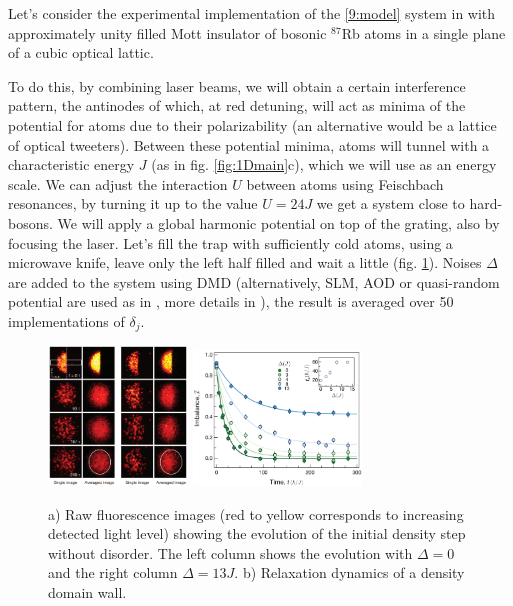 Let's consider the experimental implementation of the \eqref{9:model} system in \cite{Choi_2016} with approximately unity filled Mott insulator of bosonic ${}^{87}$Rb atoms in a single plane of a cubic optical lattic. 


To do this, by combining laser beams, we will obtain a certain interference pattern, the antinodes of which, at red detuning, will act as minima of the potential for atoms due to their polarizability (an alternative would be a lattice of optical tweeters). Between these potential minima, atoms will tunnel with a characteristic energy $J$ (as in fig. \ref{fig:1Dmain}c), which we will use as an energy scale. We can adjust the interaction $U$ between atoms using Feischbach resonances, by turning it up to the value $U=24J$ we get a system close to hard-bosons. We will apply a global harmonic potential on top of the grating, also by focusing the laser. Let's fill the trap with sufficiently cold atoms, using a microwave knife, leave only the left half filled and wait a little (fig. \ref{fig:loc2D1}). Noises $\Delta$ are added to the system using DMD (alternatively, SLM, AOD or quasi-random potential are used as in \cite{schreiber_observation_2015}, more details in \cite{abanin_many-body_2019}), the result is averaged over 50 implementations of $\delta_j$.

\begin{figure}[h]
    \centering
    \includegraphics[align=c, width=0.33\textwidth]{imgs/MBL_2D_exp_1.png}
    \hspace{10 mm} 
    \includegraphics[align=c, width=0.4\textwidth]{imgs/MBL_2D_exp_2.png}
    \caption{
        \cite{Choi_2016}
        a) Raw fluorescence images (red to yellow corresponds to increasing detected light level) showing the evolution of the initial density step without disorder. The left column shows the evolution with $\Delta=0$ and the right column $\Delta = 13 J$.
        b) Relaxation dynamics of a density domain wall.
    }
    \label{fig:loc2D1}
\end{figure}



